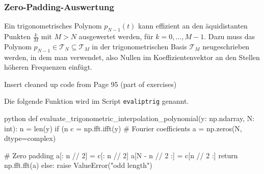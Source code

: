 \newpage
\subsubsection{Zero-Padding-Auswertung}
Ein trigonometrisches Polynom $p_{N - 1}(t)$ kann effizient an den äquidistanten Punkten $\frac{k}{M}$ mit $M > N$ ausgewertet werden, für $k = 0, \ldots, M - 1$.
Dazu muss das Polynom $p_{N - 1} \in \mathcal{T}_N \subseteq \mathcal{T}_M$ in der trigonometrischen Basis $\mathcal{T}_M$ neugeschrieben werden,
in dem man  verwendet, also Nullen im Koeffizientenvektor an den Stellen höheren Frequenzen einfügt.

\TODO Insert cleaned up code from Page 95 (part of exercises)

Die folgende Funktion wird im Script \texttt{evaliptrig} genannt.
\rmvspace
\begin{code}{python}
    def evaluate_trigonometric_interpolation_polynomial(y: np.ndarray, N: int):
        n = len(y)
        if (n %
            c = np.fft.ifft(y)  # Fourier coefficients
            a = np.zeros(N, dtype=complex)

            # Zero padding
            a[: n // 2] = c[: n // 2]
            a[N - n // 2 :] = c[n // 2 :]
            return np.fft.fft(a)
        else:
            raise ValueError("odd length")
\end{code}
